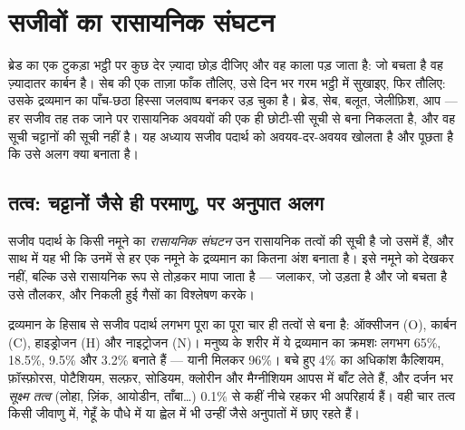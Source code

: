 \chapter{सजीवों का रासायनिक संघटन}\label{ch:g10:chemistry-of-life}

ब्रेड का एक टुकड़ा भट्ठी पर कुछ देर ज़्यादा छोड़ दीजिए और वह काला पड़
जाता है: जो बचता है वह ज़्यादातर कार्बन है। सेब की एक ताज़ा फाँक तौलिए,
उसे दिन भर गरम भट्ठी में सुखाइए, फिर तौलिए: उसके द्रव्यमान का पाँच-छठा
हिस्सा जलवाष्प बनकर उड़ चुका है। ब्रेड, सेब, बलूत, जेलीफ़िश, आप --- हर
सजीव तह तक जाने पर रासायनिक अवयवों की एक ही छोटी-सी सूची से बना निकलता
है, और वह सूची चट्टानों की सूची नहीं है। यह अध्याय सजीव पदार्थ को
अवयव-दर-अवयव खोलता है और पूछता है कि उसे अलग क्या बनाता है।

\section{तत्व: चट्टानों जैसे ही परमाणु, पर अनुपात अलग}

\begin{definition}[सजीव पदार्थ का रासायनिक संघटन]\label{def:g10:chemistry-of-life:composition}
सजीव पदार्थ के किसी नमूने का
\emph{रासायनिक संघटन} उन रासायनिक तत्वों की सूची
है जो उसमें हैं, और साथ में यह भी कि उनमें से हर एक नमूने के द्रव्यमान
का कितना अंश बनाता है। इसे नमूने को देखकर नहीं, बल्कि उसे रासायनिक रूप
से तोड़कर मापा जाता है --- जलाकर, जो उड़ता है और जो बचता है उसे तौलकर,
और निकली हुई गैसों का विश्लेषण करके।
\end{definition}

\begin{proposition}[चार तत्व सजीव शरीर का 96\% बनाते हैं]\label{prop:g10:chemistry-of-life:four}
द्रव्यमान के हिसाब से सजीव पदार्थ लगभग पूरा का पूरा चार ही तत्वों से बना
है: ऑक्सीजन (O), कार्बन (C), हाइड्रोजन (H) और नाइट्रोजन (N)। मनुष्य के
शरीर में ये द्रव्यमान का क्रमशः लगभग 65\%, 18.5\%, 9.5\% और 3.2\% बनाते
हैं --- यानी मिलकर 96\%। बचे हुए 4\% का अधिकांश कैल्शियम, फ़ॉस्फ़ोरस,
पोटैशियम, सल्फ़र, सोडियम, क्लोरीन और मैग्नीशियम आपस में बाँट लेते हैं,
और दर्जन भर \emph{सूक्ष्म तत्व} (लोहा, ज़िंक, आयोडीन, ताँबा\dots) 0.1\%
से कहीं नीचे रहकर भी अपरिहार्य हैं। वही चार तत्व किसी जीवाणु में, गेहूँ
के पौधे में या ह्वेल में भी उन्हीं जैसे अनुपातों में छाए रहते हैं।
\end{proposition}
\admitted

